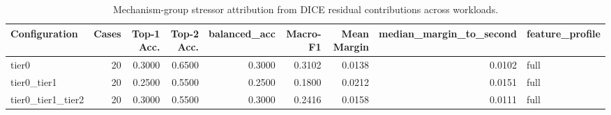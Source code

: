 \begin{table}[t]
\centering
\caption{Mechanism-group stressor attribution from DICE residual contributions across workloads.}
\label{tab:dice_stressor_diagnosis}
\footnotesize
\begin{tabular}{lrrrrrrrl}
\toprule
Configuration & Cases & Top-1 Acc. & Top-2 Acc. & balanced_acc & Macro-F1 & Mean Margin & median_margin_to_second & feature_profile \\
\midrule
tier0 & 20 & 0.3000 & 0.6500 & 0.3000 & 0.3102 & 0.0138 & 0.0102 & full \\
tier0_tier1 & 20 & 0.2500 & 0.5500 & 0.2500 & 0.1800 & 0.0212 & 0.0151 & full \\
tier0_tier1_tier2 & 20 & 0.3000 & 0.5500 & 0.3000 & 0.2416 & 0.0158 & 0.0111 & full \\
\bottomrule
\end{tabular}

\end{table}
